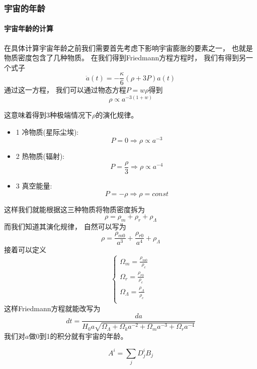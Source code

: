 \documentclass[8pt]{beamer}
\begin{document}
        \begin{frame}[fragile]
            \frametitle{宇宙的年龄}
            \framesubtitle{宇宙年龄的计算}
            \begin{multicols}{2} 
                \qquad
                在具体计算宇宙年龄之前我们需要首先考虑下影响宇宙膨胀的要素之一，
                也就是物质密度包含了几种物质。
                在我们得到Friedmann方程方程时，
                我们有得到另一个式子
                $$\ddot{a}(t)=-\frac{\kappa}{6}(\rho+3P)a(t)$$
                通过这一方程，
                我们可以通过物态方程$P=w\rho$得到
                $$\rho\varpropto a^{-3(1+w)}$$
                
                \qquad
                这意味着得到3种极端情况下$\rho$的演化规律。
                \begin{itemize}
                    \item 1 冷物质(星际尘埃):$$P=0\Rightarrow\rho\varpropto a^{-3}$$
                    \item 2 热物质(辐射):$$P=\frac{\rho}{3}\Rightarrow\rho\varpropto a^{-4}$$
                    \item 3 真空能量:$$P=-\rho\Rightarrow\rho=const$$
                \end{itemize}
                这样我们就能根据这三种物质将物质密度拆为
                $$\rho=\rho_m+\rho_r+\rho_{\varLambda }$$
                而我们知道其演化规律，
                自然可以写为$$\rho=\frac{\rho_{m0}}{a^3}+\frac{\rho_{r0}}{a^4}+\rho_{\varLambda }$$
                接着可以定义
                $$
                \begin{cases} 
                    \Omega_m=\frac{\rho_{m0}}{\rho_c}\\ 
                    \Omega_r=\frac{\rho_{r0}}{\rho_c}\\
                    \Omega_{\varLambda }=\frac{\rho_{\varLambda}}{\rho_c}\\
                \end{cases}
                $$
                这样Friedmann方程就能改写为
                $$dt=\frac{da}{H_0a\sqrt{\Omega_{\varLambda }+\Omega_{k}a^{-2}+\Omega_{m}a^{-3}+\Omega_{r}a^{-4}}}$$
                我们对$a$做0到1的积分就有宇宙的年龄。
            \end{multicols}
        \end{frame}

        \begin{equation}
            A^i=\sum_j D^i_j B_j
        \end{equation}
\end{document}
